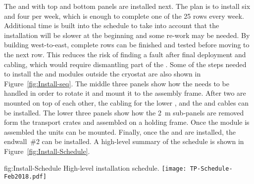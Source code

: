The  and  with top and bottom  panels are
installed next. The plan is to install six  and four
 per week, which is enough to complete one of the \num{25}
rows every week. Additional time is built into the schedule to take
into account that the installation will be slower at the beginning and
some re-work may be needed. By building west-to-east, complete rows can
be finished and tested before moving to the next row. This reduces the
risk of finding a fault after final  deployment and cabling,
which would require dismantling part of the . Some of the steps
needed to install the  and  modules outside the
cryostat are also shown in Figure~\ref{fig:Install-seq}.  The middle three
panels show how the  needs to be handled in order to rotate
it and mount it to the assembly frame. After two  are
mounted on top of each other, the cabling for the lower , and the
 and  cables can be installed. The
lower three panels show how the \SI{2}{m}  sub-panels are
removed form the transport crates and assembled on a holding frame. Once
the  module is assembled the  units can be
mounted. Finally, once the  and  are installed,
the endwall~\#2 can be installed. A high-level summary of the schedule
is shown in Figure~\ref{fig:Install-Schedule}.

\begin{dunefigure}{fig:Install-Schedule}
  {High-level installation schedule.}
 \texttt{[image: TP-Schedule-Feb2018.pdf]}
\end{dunefigure}


